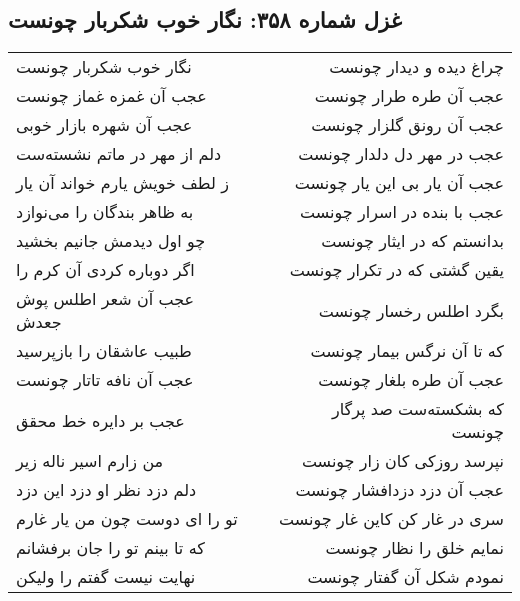 \begin{center}
\section*{غزل شماره ۳۵۸: نگار خوب شکربار چونست}
\label{sec:0358}
\begin{longtable}{l p{0.5cm} r}
نگار خوب شکربار چونست
&&
چراغ دیده و دیدار چونست
\\
عجب آن غمزه غماز چونست
&&
عجب آن طره طرار چونست
\\
عجب آن شهره بازار خوبی
&&
عجب آن رونق گلزار چونست
\\
دلم از مهر در ماتم نشسته‌ست
&&
عجب در مهر دل دلدار چونست
\\
ز لطف خویش یارم خواند آن یار
&&
عجب آن یار بی این یار چونست
\\
به ظاهر بندگان را می‌نوازد
&&
عجب با بنده در اسرار چونست
\\
چو اول دیدمش جانیم بخشید
&&
بدانستم که در ایثار چونست
\\
اگر دوباره کردی آن کرم را
&&
یقین گشتی که در تکرار چونست
\\
عجب آن شعر اطلس پوش جعدش
&&
بگرد اطلس رخسار چونست
\\
طبیب عاشقان را بازپرسید
&&
که تا آن نرگس بیمار چونست
\\
عجب آن نافه تاتار چونست
&&
عجب آن طره بلغار چونست
\\
عجب بر دایره خط محقق
&&
که بشکسته‌ست صد پرگار چونست
\\
من زارم اسیر ناله زیر
&&
نپرسد روزکی کان زار چونست
\\
دلم دزد نظر او دزد این دزد
&&
عجب آن دزد دزدافشار چونست
\\
تو را ای دوست چون من یار غارم
&&
سری در غار کن کاین غار چونست
\\
که تا بینم تو را جان برفشانم
&&
نمایم خلق را نظار چونست
\\
نهایت نیست گفتم را ولیکن
&&
نمودم شکل آن گفتار چونست
\\
\end{longtable}
\end{center}
